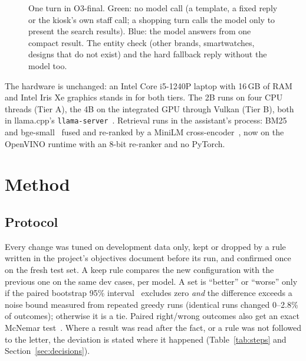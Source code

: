 \documentclass[11pt,a4paper]{article}
\begin{document}
\begin{figure}[H]
{}
\caption{One turn in O3-final. Green: no model call (a template, a fixed reply or the kiosk's own staff call; a
shopping turn calls the model only to present the search results). Blue: the model answers from one compact result.
The entity check (other brands, smartwatches, designs that do not exist) and the hard fallback reply without the model
too.}
\label{fig:pipeline}
\end{figure}

The hardware is unchanged: an Intel Core i5-1240P laptop with 16\,GB of RAM and Intel Iris Xe graphics stands in for both
tiers. The 2B runs on four CPU threads (Tier A), the 4B on the integrated GPU through Vulkan (Tier B), both in llama.cpp's
\texttt{llama-server}~\cite{llamacpp}. Retrieval runs in the assistant's process: BM25~\cite{bm25} and
bge-small~\cite{bge} fused and re-ranked by a MiniLM cross-encoder~\cite{minilm}, now on the OpenVINO runtime with an
8-bit re-ranker and no PyTorch.

\section{Method}\label{sec:method}

\subsection{Protocol}
Every change was tuned on development data only, kept or dropped by a rule written in the project's objectives document
before its run, and confirmed once on the fresh test set. A keep rule compares the new configuration with the previous
one on the same dev cases, per model. A set is ``better'' or ``worse'' only if the paired bootstrap 95\%
interval~\cite{efron} excludes zero \emph{and} the difference exceeds a noise bound measured from repeated greedy runs
(identical runs changed 0--2.8\% of outcomes); otherwise it is a tie. Paired right/wrong outcomes also get an exact
McNemar test~\cite{mcnemar}. Where a result was read after the fact, or a rule was not followed to the letter, the
deviation is stated where it happened (Table~\ref{tab:steps} and Section~\ref{sec:decisions}).
\end{document}

